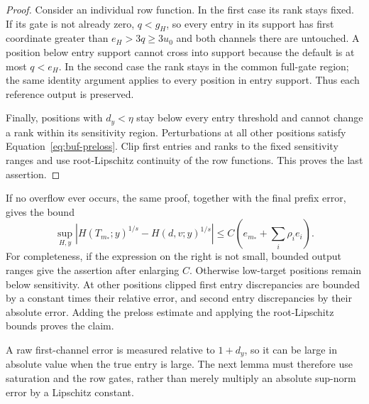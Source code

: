 \begin{proof}
Consider an individual row function.  In the first case its rank stays
fixed.  If its gate is not already zero, $q<g_H$, so every entry in its
support has first coordinate greater than $e_H>3q\geq3u_0$ and both
channels there are untouched.  A position below entry support cannot
cross into support because the default is at most $q<e_H$.
In the second case the rank stays in the common full-gate region; the
same identity argument applies to every position in entry support.
Thus each reference output is preserved.

Finally, positions with $d_y<\eta$ stay below every entry threshold and
cannot change a rank within its sensitivity region.  Perturbations at
all other positions satisfy Equation~\eqref{eq:buf-preloss}.  Clip first
entries and ranks to the fixed sensitivity ranges and use root-Lipschitz
continuity of the row functions.  This proves the last assertion.
\end{proof}

If no overflow ever occurs, the same proof, together with the final prefix
error, gives the bound
\begin{equation}
 \sup_{H,y}|H(T_{m_*};y)^{1/s}-H(d,v;y)^{1/s}|
       \leq C\left(e_{m_*}+\sum_i\rho_i e_i\right).
 \label{eq:buf-no-overflow}
\end{equation}
For completeness, if the expression on the right is not small, bounded
output ranges give the assertion after enlarging $C$.  Otherwise low-target
positions remain below sensitivity.  At other positions clipped first
entry discrepancies are bounded by a constant times their relative error,
and second entry discrepancies by their absolute error.  Adding the
preloss estimate and applying the root-Lipschitz bounds proves the claim.

A raw first-channel error is measured relative to $1+d_y$, so it can be large in absolute value when the true entry is large. The next lemma must therefore use saturation and the row gates, rather than merely multiply an absolute sup-norm error by a Lipschitz constant.

